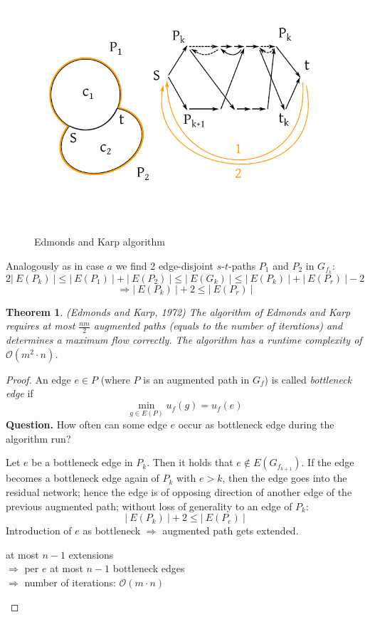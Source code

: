 \documentclass{article}
\newtheorem{theorem}{Theorem}
\newcommand{\card}[1]{\left|\:\!#1\:\!\right|}
\newcommand{\gath}[2]{$#1$-$#2$-path} %
\begin{document}
\begin{figure}[ht]
 \begin{center}
  \includegraphics{img/ek_algorithm2.pdf}
  \caption{Edmonds and Karp algorithm}
 \end{center}
\end{figure}

Analogously as in case $a$ we find 2 edge-disjoint \gath sts $P_1$ and $P_2$ in $G_{f_k}$:
\[
  2 \card{E(P_k)} \leq \card{E(P_1)} + \card{E(P_2)} \leq \card{E(G_k)} \leq \card{E(P_k)} + \card{E(P_r)} - 2
\] \[
  \Rightarrow \card{E(P_k)} + 2 \leq \card{E(P_r)}
\]

\begin{theorem}\label{satz-4.6}
  (Edmonds and Karp, 1972)
  The algorithm of Edmonds and Karp requires at most $\frac{nm}2$ augmented paths (equals to the number of iterations) and determines a maximum flow correctly. The algorithm has a runtime complexity of $\mathcal{O}(m^2 \cdot n)$.
\end{theorem}

\begin{proof}
  An edge $e \in P$ (where $P$ is an augmented path in $G_f$) is called \emph{bottleneck edge} if
  \[
    \min_{g \in E(P)} u_f(g) = u_f(e)
  \]
  \textbf{Question.}
    How often can some edge $e$ occur as bottleneck edge during the algorithm run?

    Let $e$ be a bottleneck edge in $P_k$. Then it holds that $e \notin E(G_{f_{k+1}})$. If the edge becomes a bottleneck edge again of $P_k$ with $e > k$, then the edge goes into the residual network; hence the edge is of opposing direction of another edge of the previous augmented path; without loss of generality to an edge of $P_k$:
    \[
      \card{E(P_k)} + 2 \leq \card{E(P_e)}
    \]
    Introduction of $e$ as bottleneck $\Rightarrow$ augmented path gets extended.
    \begin{center}
      at most $n - 1$ extensions \\
      $\Rightarrow$ per $e$ at most $n-1$ bottleneck edges \\
      $\Rightarrow$ number of iterations: $\mathcal{O}(m\cdot n)$
    \end{center}
\end{proof}
\end{document}
